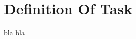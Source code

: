 \chapter{Definition Of Task}
\label{sec:taskdef}

\begin{*environment-name*}
	bla bla
	
	
\end{*environment-name*}